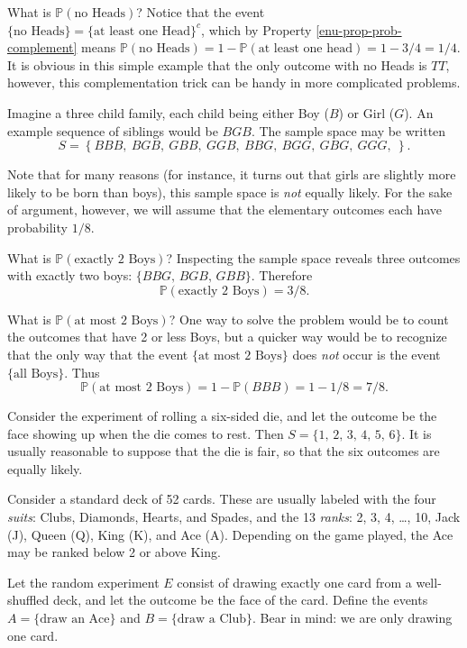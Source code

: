 What is \(\mathbb{P}(\mbox{no Heads})\)? Notice that the event \(\{
\mbox{no Heads} \} = \{ \mbox{at least one Head} \} ^{c}\), which by
Property \ref{enu-prop-prob-complement} means \(\mathbb{P}(\mbox{no
Heads})=1-\mathbb{P}(\mbox{at least one head})=1-3/4=1/4\). It is
obvious in this simple example that the only outcome with no Heads is
\(TT\), however, this complementation trick can be handy in more
complicated problems.


\label{exa-three-child-family} Imagine a three child family, each child
being either Boy (\(B\)) or Girl (\(G\)). An example sequence of
siblings would be \(BGB\). The sample space may be written \[ S =
\left\{ BBB,\ BGB,\ GBB,\ GGB,\ BBG,\ BGG,\ GBG,\ GGG,\ \right\}.\]

Note that for many reasons (for instance, it turns out that girls are
slightly more likely to be born than boys), this sample space is \emph{not}
equally likely. For the sake of argument, however, we will assume that
the elementary outcomes each have probability \(1/8\).

What is \(\mathbb{P}(\mbox{exactly 2 Boys})\)? Inspecting the sample
space reveals three outcomes with exactly two boys: \( \{ BBG,\,
BGB,\, GBB \} \).
Therefore \[ \mathbb{P}(\mbox{exactly 2 Boys}) = 3/8. \]

What is \(\mathbb{P}(\mbox{at most 2 Boys})\)? One way to solve the
problem would be to count the outcomes that have 2 or less Boys, but a
quicker way would be to recognize that the only way that the event
\(\{ \mbox{at most 2 Boys} \}\) does \emph{not} occur is the event \(\{
\mbox{all Boys} \}\).
Thus \[ \mathbb{P}(\mbox{at most 2 Boys}) = 1 - \mathbb{P}(BBB) = 1 -
1/8 = 7/8. \]




Consider the experiment of rolling a six-sided die, and let the
outcome be the face showing up when the die comes to rest. Then \( S =
\{ 1,\,2,\,3,\,4,\,5,\,6 \} \). It is usually reasonable to suppose
that the die is fair, so that the six outcomes are equally likely.



Consider a standard deck of 52 cards. These are usually labeled with
the four \emph{suits}: Clubs, Diamonds, Hearts, and Spades, and the 13
\emph{ranks}: 2, 3, 4, \ldots{}, 10, Jack (J), Queen (Q), King (K), and Ace
(A). Depending on the game played, the Ace may be ranked below 2 or
above King.

Let the random experiment \(E\) consist of drawing exactly one card
from a well-shuffled deck, and let the outcome be the face of the
card. Define the events \( A = \{ \mbox{draw an Ace} \} \) and \( B =
\{ \mbox{draw a Club} \} \). Bear in mind: we are only drawing one
card.

